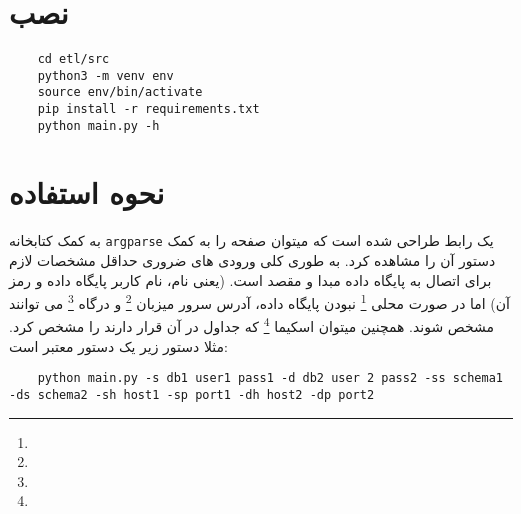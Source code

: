 \documentclass{article}
\title{\textbf{\homework}}
\author{\meAndStudentNumber}
\date{}
\begin{document}
\maketitle

\doublespacing

\section*{نصب}

\begin{latin}
\begin{lstlisting}
	cd etl/src
	python3 -m venv env
	source env/bin/activate
	pip install -r requirements.txt
	python main.py -h
\end{lstlisting}
\end{latin}

\section*{نحوه استفاده}

به کمک کتابخانه 
\lstinline|argparse|
یک رابط 
طراحی شده است که میتوان صفحه 
را به کمک دستور
آن را مشاهده کرد. به طوری کلی ورودی های ضروری حداقل مشخصات لازم برای اتصال به پایگاه داده مبدا و مقصد است. (یعنی نام، نام کاربر پایگاه داده و رمز آن) اما در صورت محلی
\footnote{}
نبودن پایگاه داده، آدرس سرور میزبان
\footnote{}
و درگاه 
\footnote{}
می توانند مشخص شوند. همچنین میتوان اسکیما 
\footnote{}
که جداول در آن قرار دارند را مشخص کرد.  مثلا دستور زیر یک دستور معتبر است:
\begin{latin}
\begin{lstlisting}
	python main.py -s db1 user1 pass1 -d db2 user 2 pass2 -ss schema1 -ds schema2 -sh host1 -sp port1 -dh host2 -dp port2
\end{lstlisting}
\end{latin}
\end{document}
